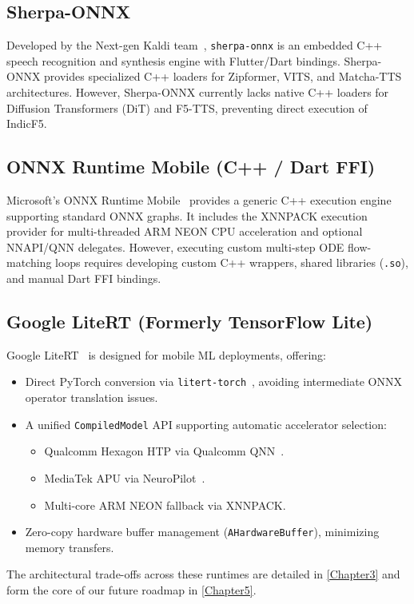 \subsection{Sherpa-ONNX}
Developed by the Next-gen Kaldi team~\cite{sherpaonnx2023}, \texttt{sherpa-onnx} is an embedded C++ speech recognition and synthesis engine with Flutter/Dart bindings. Sherpa-ONNX provides specialized C++ loaders for Zipformer, VITS, and Matcha-TTS architectures. However, Sherpa-ONNX currently lacks native C++ loaders for Diffusion Transformers (DiT) and F5-TTS, preventing direct execution of IndicF5.

\subsection{ONNX Runtime Mobile (C++ / Dart FFI)}
Microsoft's ONNX Runtime Mobile~\cite{onnxruntime2021} provides a generic C++ execution engine supporting standard ONNX graphs. It includes the XNNPACK execution provider for multi-threaded ARM NEON CPU acceleration and optional NNAPI/QNN delegates. However, executing custom multi-step ODE flow-matching loops requires developing custom C++ wrappers, shared libraries (\texttt{.so}), and manual Dart FFI bindings.

\subsection{Google LiteRT (Formerly TensorFlow Lite)}
Google LiteRT~\cite{google_litert2024} is designed for mobile ML deployments, offering:
\begin{itemize}
    \item Direct PyTorch conversion via \texttt{litert-torch}~\cite{litert_torch2024}, avoiding intermediate ONNX operator translation issues.
    \item A unified \texttt{CompiledModel} API supporting automatic accelerator selection:
    \begin{itemize}
        \item Qualcomm Hexagon HTP via Qualcomm QNN~\cite{qualcomm_qnn2024}.
        \item MediaTek APU via NeuroPilot~\cite{mediatek_neuropilot2024}.
        \item Multi-core ARM NEON fallback via XNNPACK.
    \end{itemize}
    \item Zero-copy hardware buffer management (\texttt{AHardwareBuffer}), minimizing memory transfers.
\end{itemize}
The architectural trade-offs across these runtimes are detailed in \cref{Chapter3} and form the core of our future roadmap in \cref{Chapter5}.